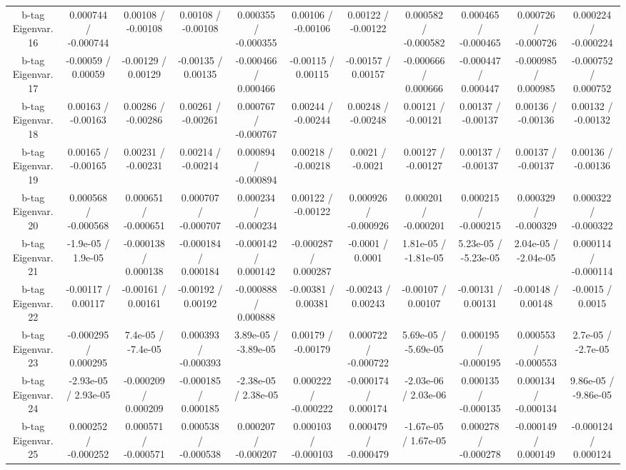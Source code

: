 \begin{table}[htbp]
\begin{center}
\begin{tabular}{|c|c|c|c|c|c|c|c|c|c|c|}
  b-tag Eigenvar. 16 & 0.000744 / -0.000744 & 0.00108 / -0.00108 & 0.00108 / -0.00108 & 0.000355 / -0.000355 & 0.00106 / -0.00106 & 0.00122 / -0.00122 & 0.000582 / -0.000582 & 0.000465 / -0.000465 & 0.000726 / -0.000726 & 0.000224 / -0.000224 \\ 
  b-tag Eigenvar. 17 & -0.00059 / 0.00059 & -0.00129 / 0.00129 & -0.00135 / 0.00135 & -0.000466 / 0.000466 & -0.00115 / 0.00115 & -0.00157 / 0.00157 & -0.000666 / 0.000666 & -0.000447 / 0.000447 & -0.000985 / 0.000985 & -0.000752 / 0.000752 \\ 
  b-tag Eigenvar. 18 & 0.00163 / -0.00163 & 0.00286 / -0.00286 & 0.00261 / -0.00261 & 0.000767 / -0.000767 & 0.00244 / -0.00244 & 0.00248 / -0.00248 & 0.00121 / -0.00121 & 0.00137 / -0.00137 & 0.00136 / -0.00136 & 0.00132 / -0.00132 \\ 
  b-tag Eigenvar. 19 & 0.00165 / -0.00165 & 0.00231 / -0.00231 & 0.00214 / -0.00214 & 0.000894 / -0.000894 & 0.00218 / -0.00218 & 0.0021 / -0.0021 & 0.00127 / -0.00127 & 0.00137 / -0.00137 & 0.00137 / -0.00137 & 0.00136 / -0.00136 \\ 
  b-tag Eigenvar. 20 & 0.000568 / -0.000568 & 0.000651 / -0.000651 & 0.000707 / -0.000707 & 0.000234 / -0.000234 & 0.00122 / -0.00122 & 0.000926 / -0.000926 & 0.000201 / -0.000201 & 0.000215 / -0.000215 & 0.000329 / -0.000329 & 0.000322 / -0.000322 \\ 
  b-tag Eigenvar. 21 & -1.9e-05 / 1.9e-05 & -0.000138 / 0.000138 & -0.000184 / 0.000184 & -0.000142 / 0.000142 & -0.000287 / 0.000287 & -0.0001 / 0.0001 & 1.81e-05 / -1.81e-05 & 5.23e-05 / -5.23e-05 & 2.04e-05 / -2.04e-05 & 0.000114 / -0.000114 \\ 
  b-tag Eigenvar. 22 & -0.00117 / 0.00117 & -0.00161 / 0.00161 & -0.00192 / 0.00192 & -0.000888 / 0.000888 & -0.00381 / 0.00381 & -0.00243 / 0.00243 & -0.00107 / 0.00107 & -0.00131 / 0.00131 & -0.00148 / 0.00148 & -0.0015 / 0.0015 \\ 
  b-tag Eigenvar. 23 & -0.000295 / 0.000295 & 7.4e-05 / -7.4e-05 & 0.000393 / -0.000393 & 3.89e-05 / -3.89e-05 & 0.00179 / -0.00179 & 0.000722 / -0.000722 & 5.69e-05 / -5.69e-05 & 0.000195 / -0.000195 & 0.000553 / -0.000553 & 2.7e-05 / -2.7e-05 \\ 
  b-tag Eigenvar. 24 & -2.93e-05 / 2.93e-05 & -0.000209 / 0.000209 & -0.000185 / 0.000185 & -2.38e-05 / 2.38e-05 & 0.000222 / -0.000222 & -0.000174 / 0.000174 & -2.03e-06 / 2.03e-06 & 0.000135 / -0.000135 & 0.000134 / -0.000134 & 9.86e-05 / -9.86e-05 \\ 
  b-tag Eigenvar. 25 & 0.000252 / -0.000252 & 0.000571 / -0.000571 & 0.000538 / -0.000538 & 0.000207 / -0.000207 & 0.000103 / -0.000103 & 0.000479 / -0.000479 & -1.67e-05 / 1.67e-05 & 0.000278 / -0.000278 & -0.000149 / 0.000149 & -0.000124 / 0.000124 \\ 

\end{tabular}
\end{center}
\end{table}
